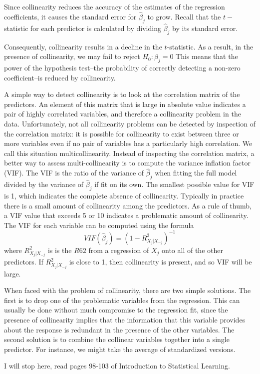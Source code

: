 \begin{description}
Since collinearity reduces the accuracy of the 
estimates of the regression coefficients, it causes 
the standard error for $\hat \beta_j$ to grow. Recall that the 
$t-$statistic for each predictor is calculated by 
dividing $\hat \beta_j$ by its standard error. 

Consequently, collinearity results in a decline 
in the $t$-statistic. As a result, in the presence of 
collinearity, we may fail to reject $H_0: \beta_j = 0$
This means that the power of the hypothesis test--the 
probability of correctly detecting a non-zero coefficient--is 
reduced by collinearity.

A simple way to detect collinearity is to look at the 
correlation matrix of the predictors. An element of this matrix 
that is large in absolute value indicates a pair of highly correlated 
variables, and therefore a collinearity problem in the data. 
Unfortunately, not all collinearity problems can be detected by 
inspection of the correlation matrix: it is possible for collinearity 
to exist between three or more variables even if no pair 
of variables has a particularly high correlation. We call this 
situation multicollinearity.
Instead of inspecting the correlation matrix, a better 
way to assess multi-collinearity is to compute the 
variance inflation factor (VIF). The VIF is the ratio of 
the variance of $\hat \beta_j$ when fitting the full model divided by 
the variance of $\hat \beta_j$ if fit on its own. The smallest 
possible value for VIF is 1, which indicates the complete 
absence of collinearity. Typically in practice there is a small 
amount of collinearity among the predictors. As a rule of thumb, 
a VIF value that exceeds 5 or 10 indicates a problematic 
amount of collinearity. The VIF for each variable can be 
computed using the formula
\begin{equation}
\label{eq:VIF}
VIF(\hat \beta_j) =  \left(1 - R^2_{X_j|X_{-j}} \right)^{-1}
\end{equation}
where $R^2_{X_j|X_{-j}}$ is is the $R62$ from a regression of
$X_j$ onto all of the other predictors. If $R^2_{X_j|X_{-j}}$
is close to 1, then collinearity is present, and so VIF will be large.

When faced with the problem of collinearity, there are two 
simple solutions. The first is to drop one of the problematic 
variables from the regression. This can usually be done 
without much compromise to the regression fit, since the 
presence of collinearity implies that the information that this 
variable provides about the response is redundant in the 
presence of the other variables. The second solution is to combine 
the collinear variables together into a single predictor. 
For instance, we might take the average of standardized versions.

I will stop here, read pages 98-103 of Introduction to Statistical Learning\cite{james2013introduction}.
\end{description}
